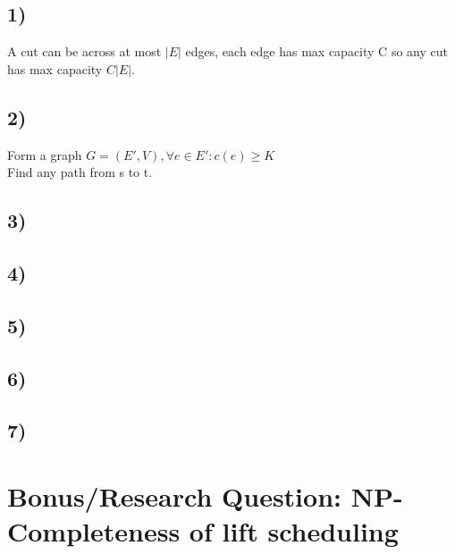 \documentclass[a4paper]{article}
\begin{document}
\subsection*{1)}
A cut can be across at most $|E|$ edges, each edge has max capacity C so any cut has max capacity $C|E|$.
\subsection*{2)}
Form a graph $G = (E',V), \forall e\in E': c(e)\geq K$ \\
Find any path from s to t.
\subsection*{3)}
\subsection*{4)}

\subsection*{5)}
\subsection*{6)}
\subsection*{7)}

\section{Bonus/Research Question: NP-Completeness of lift scheduling}
\end{document}

